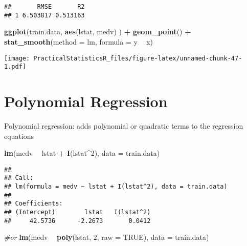 \documentclass[]{article}
\newenvironment{Shaded}{\begin{snugshade}}{\end{snugshade}}
\newcommand{\CommentTok}[1]{\textcolor[rgb]{0.56,0.35,0.01}{\textit{#1}}}
\newcommand{\DataTypeTok}[1]{\textcolor[rgb]{0.13,0.29,0.53}{#1}}
\newcommand{\DecValTok}[1]{\textcolor[rgb]{0.00,0.00,0.81}{#1}}
\newcommand{\KeywordTok}[1]{\textcolor[rgb]{0.13,0.29,0.53}{\textbf{#1}}}
\newcommand{\NormalTok}[1]{#1}
\newcommand{\OperatorTok}[1]{\textcolor[rgb]{0.81,0.36,0.00}{\textbf{#1}}}
\newcommand{\OtherTok}[1]{\textcolor[rgb]{0.56,0.35,0.01}{#1}}
\newcommand{\StringTok}[1]{\textcolor[rgb]{0.31,0.60,0.02}{#1}}
\begin{document}
\begin{verbatim}
##       RMSE       R2
## 1 6.503817 0.513163
\end{verbatim}

\begin{Shaded}
\begin{Highlighting}[]
\KeywordTok{ggplot}\NormalTok{(train.data, }\KeywordTok{aes}\NormalTok{(lstat, medv) ) }\OperatorTok{+}
\StringTok{  }\KeywordTok{geom_point}\NormalTok{() }\OperatorTok{+}
\StringTok{  }\KeywordTok{stat_smooth}\NormalTok{(}\DataTypeTok{method =}\NormalTok{ lm, }\DataTypeTok{formula =}\NormalTok{ y }\OperatorTok{~}\StringTok{ }\NormalTok{x)}
\end{Highlighting}
\end{Shaded}

\texttt{[image: PracticalStatisticsR\_files/figure-latex/unnamed-chunk-47-1.pdf]}

\hypertarget{polynomial-regression}{%
\section{Polynomial Regression}\label{polynomial-regression}}

Polynomial regression: adds polynomial or quadratic terms to the
regression equations

\begin{Shaded}
\begin{Highlighting}[]
\KeywordTok{lm}\NormalTok{(medv }\OperatorTok{~}\StringTok{ }\NormalTok{lstat }\OperatorTok{+}\StringTok{ }\KeywordTok{I}\NormalTok{(lstat}\OperatorTok{^}\DecValTok{2}\NormalTok{), }\DataTypeTok{data =}\NormalTok{ train.data)}
\end{Highlighting}
\end{Shaded}

\begin{verbatim}
## 
## Call:
## lm(formula = medv ~ lstat + I(lstat^2), data = train.data)
## 
## Coefficients:
## (Intercept)        lstat   I(lstat^2)  
##     42.5736      -2.2673       0.0412
\end{verbatim}

\begin{Shaded}
\begin{Highlighting}[]
\CommentTok{#or}
\KeywordTok{lm}\NormalTok{(medv }\OperatorTok{~}\StringTok{ }\KeywordTok{poly}\NormalTok{(lstat, }\DecValTok{2}\NormalTok{, }\DataTypeTok{raw =} \OtherTok{TRUE}\NormalTok{), }\DataTypeTok{data =}\NormalTok{ train.data)}
\end{Highlighting}
\end{Shaded}
\end{document}
